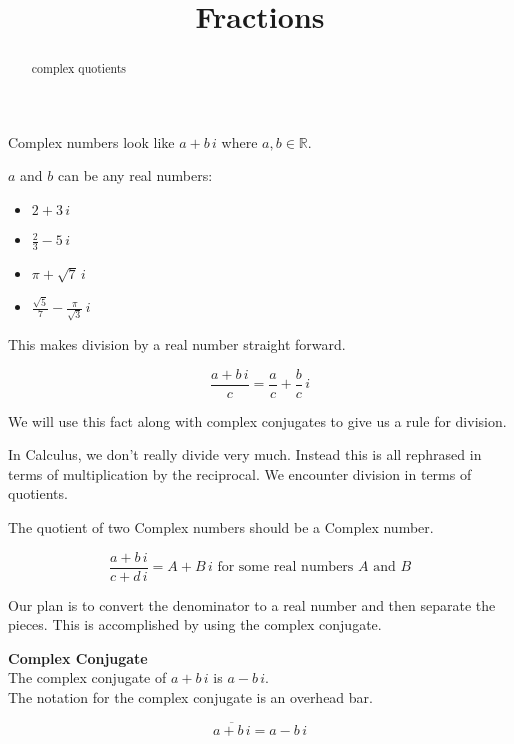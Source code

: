 \documentclass{ximera}
\title{Fractions}
\begin{document}
\begin{abstract}
complex quotients
\end{abstract}
\maketitle




Complex numbers look like $a + b \, i$ where $a, b \in \mathbb{R}$.


$a$ and $b$ can be any real numbers:



\begin{itemize}
	\item $2 + 3 \, i$
	\item $\frac{2}{3} - 5 \, i$
	\item $\pi + \sqrt{7} \, i$
	\item $\frac{\sqrt{5}}{7} - \frac{\pi}{\sqrt{3}} \, i$
\end{itemize}



This makes division by a real number straight forward.




\[
\frac{a + b \, i}{c} = \frac{a}{c} + \frac{b}{c} \, i
\]





We will use this fact along with complex conjugates to give us a rule for division.



In Calculus, we don't really divide very much.  Instead this is all rephrased in terms of multiplication by the reciprocal.  We encounter division in terms of quotients.


The quotient of two Complex numbers should be a Complex number.

\[
\frac{a + b \, i}{c + d \, i}  = A + B \, i  \text{ for some real numbers } A \text{ and } B
\]


Our plan is to convert the denominator to a real number and then separate the pieces.  This is accomplished by using the complex conjugate.

\begin{definition}  \textbf{\textcolor{green!50!black}{Complex Conjugate}} \\


The complex conjugate of $a + b \, i$ is $a - b \, i$. \\


The notation for the complex conjugate is an overhead bar.

\[
\overline{a + b \, i} = a - b \, i
\]


\end{definition}
\end{document}
